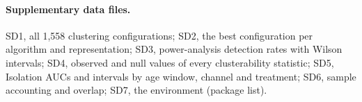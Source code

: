 \documentclass[11pt]{article}
\begin{document}
\paragraph{Supplementary data files.} SD1, all 1,558 clustering configurations; SD2, the best configuration per algorithm and representation; SD3, power-analysis detection rates with Wilson intervals; SD4, observed and null values of every clusterability statistic; SD5, Isolation AUCs and intervals by age window, channel and treatment; SD6, sample accounting and overlap; SD7, the environment (package list).
\end{document}
